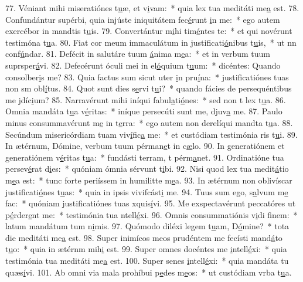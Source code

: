 77. Véniant mihi miseratiónes t\uline{u}æ, et v\uline{i}vam:~* quia lex tua meditáti me\uline{a} est.
78. Confundántur supérbi, quia injúste iniquitátem fec\uline{é}runt \uline{i}n me:~* ego autem exercébor in mandtis t\uline{u}is.
79. Convertántur m\uline{i}hi tim\uline{é}ntes te:~* et qui novérunt testimóna t\uline{u}a.
80. Fiat cor meum immaculátum in justificati\uline{ó}nibus t\uline{u}is,~* ut nn conf\uline{ú}ndar.
81. Defécit in salutáre tuum \uline{á}nima m\uline{e}a:~* et in verbum tuum suprsper\uline{á}vi.
82. Defecérunt óculi mei in el\uline{ó}quium t\uline{u}um:~* dicéntes: Quando consolber\uline{i}s me?
83. Quia factus sum sicut uter \uline{i}n pru\uline{í}na:~* justificatiónes tuas non sm obl\uline{í}tus.
84. Quot sunt dies s\uline{e}rvi t\uline{u}i?~* quando fácies de persequéntibus me jdíc\uline{i}um?
85. Narravérunt mihi iníqui fabul\uline{a}ti\uline{ó}nes:~* sed non t lex t\uline{u}a.
86. Omnia mandáta t\uline{u}a v\uline{é}ritas:~* iníque persecúti sunt me, djuv\uline{a} me.
87. Paulo minus consummavérunt m\uline{e} in t\uline{e}rra:~* ego autem non derelíqui mandta t\uline{u}a.
88. Secúndum misericórdiam tuam viv\uline{í}fic\uline{a} me:~* et custódiam testimónia ris t\uline{u}i.
89. In ætérnum, Dómine, verbum tuum pérman\uline{e}t in c\uline{æ}lo.
90. In generatiónem et generatiónem v\uline{é}ritas t\uline{u}a:~* fundásti terram, t pérm\uline{a}net.
91. Ordinatióne tua persev\uline{é}rat d\uline{i}es:~* quóniam ómnia sérvunt t\uline{i}bi.
92. Nisi quod lex tua medit\uline{á}tio m\uline{e}a est:~* tunc forte periíssem in humilitte m\uline{e}a.
93. In ætérnum non oblivíscar justificati\uline{ó}nes t\uline{u}as:~* quia in ipsis vivifcást\uline{i} me.
94. Tuus sum ego, s\uline{a}lvum m\uline{e} fac:~* quóniam justificatiónes tuas xquis\uline{í}vi.
95. Me exspectavérunt peccatóres ut p\uline{é}rder\uline{e}nt me:~* testimónia tua ntell\uline{é}xi.
96. Omnis consummatiónis v\uline{i}di f\uline{i}nem:~* latum mandátum tum n\uline{i}mis.
97. Quómodo diléxi legem t\uline{u}am, D\uline{ó}mine?~* tota die meditáti me\uline{a} est.
98. Super inimícos meos prudéntem me fecísti mand\uline{á}to t\uline{u}o:~* quia in ætérnm mih\uline{i} est.
99. Super omnes docéntes me \uline{i}ntell\uline{é}xi:~* quia testimónia tua meditáti me\uline{a} est.
100. Super senes \uline{i}ntell\uline{é}xi:~* quia mandáta tu quæs\uline{í}vi.
101. Ab omni via mala prohíbui p\uline{e}des m\uline{e}os:~* ut custódiam vrba t\uline{u}a.
